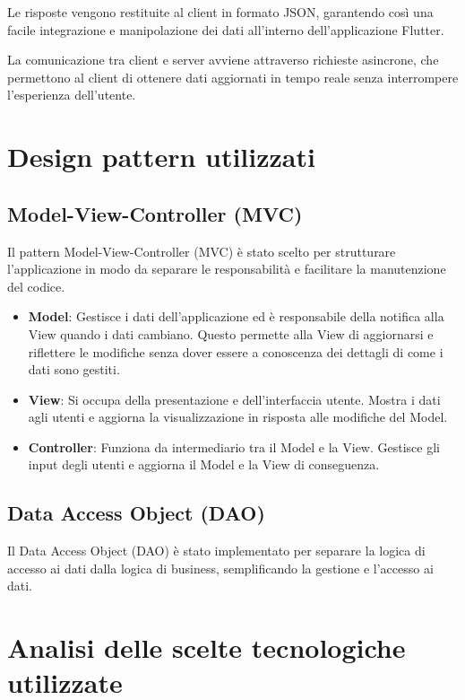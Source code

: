 Le risposte vengono restituite al client in formato JSON, garantendo così una facile integrazione e manipolazione dei dati all'interno dell'applicazione Flutter.

La comunicazione tra client e server avviene attraverso richieste asincrone, che permettono al client di ottenere dati aggiornati in tempo reale senza interrompere l'esperienza dell'utente.

\section{Design pattern utilizzati}

\subsection{Model-View-Controller (MVC)}
Il pattern Model-View-Controller (MVC) è stato scelto per strutturare l'applicazione in modo da separare le responsabilità e facilitare la manutenzione del codice.

\begin{itemize}
	\item \textbf{Model}: Gestisce i dati dell'applicazione ed è responsabile della notifica alla View quando i dati cambiano. Questo permette alla View di aggiornarsi e riflettere le modifiche senza dover essere a conoscenza dei dettagli di come i dati sono gestiti.

	\item \textbf{View}: Si occupa della presentazione e dell'interfaccia utente. Mostra i dati agli utenti e aggiorna la visualizzazione in risposta alle modifiche del Model.

	\item \textbf{Controller}: Funziona da intermediario tra il Model e la View. Gestisce gli input degli utenti e aggiorna il Model e la View di conseguenza.
\end{itemize}

\subsection{Data Access Object (DAO)}
Il Data Access Object (DAO) è stato implementato per separare la logica di accesso ai dati dalla logica di business, semplificando la gestione e l'accesso ai dati.

\newpage

\section{Analisi delle scelte tecnologiche utilizzate}
